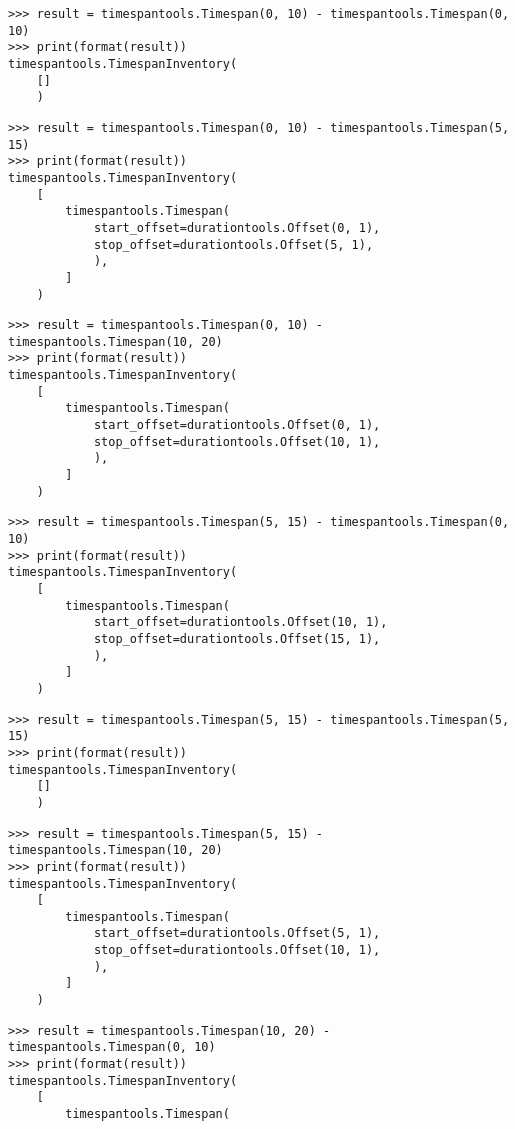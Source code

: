 \begin{singlespacing}
\vspace{-0.5\baselineskip}
\begin{lstlisting}
>>> result = timespantools.Timespan(0, 10) - timespantools.Timespan(0, 10)
>>> print(format(result))
timespantools.TimespanInventory(
    []
    )
\end{lstlisting}
\begin{lstlisting}
>>> result = timespantools.Timespan(0, 10) - timespantools.Timespan(5, 15)
>>> print(format(result))
timespantools.TimespanInventory(
    [
        timespantools.Timespan(
            start_offset=durationtools.Offset(0, 1),
            stop_offset=durationtools.Offset(5, 1),
            ),
        ]
    )
\end{lstlisting}
\begin{lstlisting}
>>> result = timespantools.Timespan(0, 10) - timespantools.Timespan(10, 20)
>>> print(format(result))
timespantools.TimespanInventory(
    [
        timespantools.Timespan(
            start_offset=durationtools.Offset(0, 1),
            stop_offset=durationtools.Offset(10, 1),
            ),
        ]
    )
\end{lstlisting}
\begin{lstlisting}
>>> result = timespantools.Timespan(5, 15) - timespantools.Timespan(0, 10)
>>> print(format(result))
timespantools.TimespanInventory(
    [
        timespantools.Timespan(
            start_offset=durationtools.Offset(10, 1),
            stop_offset=durationtools.Offset(15, 1),
            ),
        ]
    )
\end{lstlisting}
\begin{lstlisting}
>>> result = timespantools.Timespan(5, 15) - timespantools.Timespan(5, 15)
>>> print(format(result))
timespantools.TimespanInventory(
    []
    )
\end{lstlisting}
\begin{lstlisting}
>>> result = timespantools.Timespan(5, 15) - timespantools.Timespan(10, 20)
>>> print(format(result))
timespantools.TimespanInventory(
    [
        timespantools.Timespan(
            start_offset=durationtools.Offset(5, 1),
            stop_offset=durationtools.Offset(10, 1),
            ),
        ]
    )
\end{lstlisting}
\begin{lstlisting}
>>> result = timespantools.Timespan(10, 20) - timespantools.Timespan(0, 10)
>>> print(format(result))
timespantools.TimespanInventory(
    [
        timespantools.Timespan(

\end{lstlisting}
\end{singlespacing}

